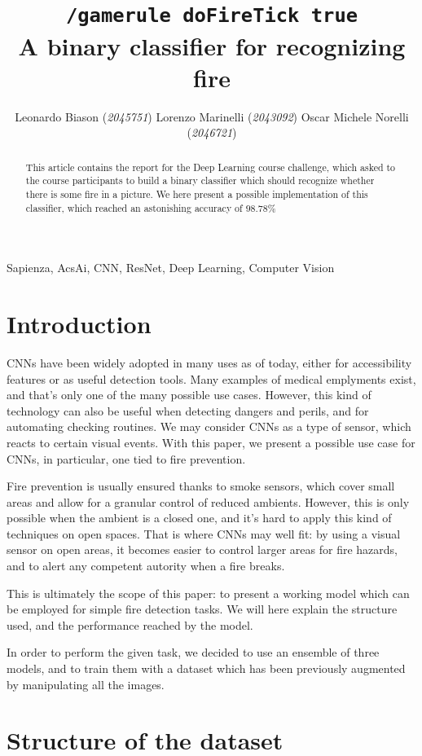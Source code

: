 \documentclass[11pt, journal]{IEEEtran}
\title{\texttt{/gamerule doFireTick true}\\A binary classifier for recognizing fire}
\author{Leonardo Biason (\textit{2045751}) \quad Lorenzo Marinelli (\textit{2043092}) \quad Oscar Michele Norelli (\textit{2046721})}
\newcommand{\nl}{

\medskip

}
\newcommand{\nl}{

\medskip

}
\begin{document}
\maketitle

\begin{abstract}
    This article contains the report for the Deep Learning course challenge, which asked to the course participants to build a binary classifier which should recognize whether there is some fire in a picture. We here present a possible implementation of this classifier, which reached an astonishing accuracy of $\mathbf{98.78\%}$
\end{abstract}

\begin{keywords}
    Sapienza, AcsAi, CNN, ResNet, Deep Learning, Computer Vision 
\end{keywords}

\section{Introduction}

CNNs have been widely adopted in many uses as of today, either for accessibility features or as useful detection tools. Many examples of medical emplyments exist, and that's only one of the many possible use cases. However, this kind of technology can also be useful when detecting dangers and perils, and for automating checking routines. We may consider CNNs as a type of sensor, which reacts to certain visual events. With this paper, we present a possible use case for CNNs, in particular, one tied to fire prevention.
\nl
\indent Fire prevention is usually ensured thanks to smoke sensors, which cover small areas and allow for a granular control of reduced ambients. However, this is only possible when the ambient is a closed one, and it's hard to apply this kind of techniques on open spaces. That is where CNNs may well fit: by using a visual sensor on open areas, it becomes easier to control larger areas for fire hazards, and to alert any competent autority when a fire breaks.
\nl
\indent This is ultimately the scope of this paper: to present a working model which can be employed for simple fire detection tasks. We will here explain the structure used, and the performance reached by the model.
\nl
In order to perform the given task, we decided to use an ensemble of three models, and to train them with a dataset which has been previously augmented by manipulating all the images.

\section{Structure of the dataset}
\end{document}
